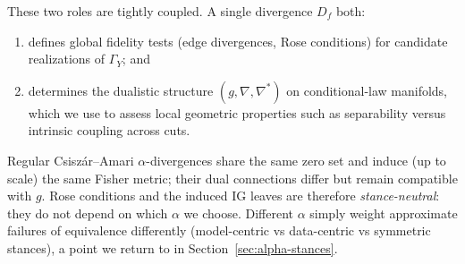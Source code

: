 \documentclass[11pt]{article}
\newcommand{\1}{\mathbf{1}}
\begin{document}
These two roles are tightly coupled. A single divergence $D_f$ both:
\begin{enumerate}[leftmargin=1.5em]
  \item defines global fidelity tests (edge divergences, Rose conditions) for candidate realizations of $\Gamma_Y$; and
  \item determines the dualistic structure $(g,\nabla,\nabla^\ast)$ on conditional-law manifolds, which we use to assess local geometric properties such as separability versus intrinsic coupling across cuts.
\end{enumerate}
Regular Csiszár--Amari $\alpha$-divergences share the same zero set and induce (up to scale) the same Fisher metric; their dual connections differ but remain compatible with $g$. Rose conditions and the induced IG leaves are therefore \emph{stance-neutral}: they do not depend on which $\alpha$ we choose. Different $\alpha$ simply weight approximate failures of equivalence differently (model-centric vs data-centric vs symmetric stances), a point we return to in Section~\ref{sec:alpha-stances}.
\end{document}

